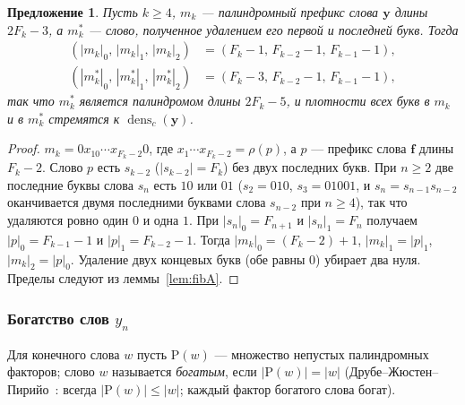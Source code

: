 \documentclass[a4paper,14pt]{extreport}
\theoremstyle{plain}
\newtheorem{proposition}[theorem]{Предложение}
\theoremstyle{definition}
\theoremstyle{remark}
\begin{document}
\begin{proposition}\label{prop:mk}
	Пусть $k\ge4$, $m_k$ --- палиндромный префикс слова $\mathbf y$ длины $2F_k-3$, а $m_k^*$ --- слово, полученное удалением
	его первой и последней букв. Тогда
	\begin{align}
		(|m_k|_0,\,|m_k|_1,\,|m_k|_2)&=(F_k-1,\,F_{k-2}-1,\,F_{k-1}-1),\\
		(|m_k^*|_0,\,|m_k^*|_1,\,|m_k^*|_2)&=(F_k-3,\,F_{k-2}-1,\,F_{k-1}-1),
	\end{align}
	\noindent так что $m_k^*$ является палиндромом длины $2F_k-5$, и плотности всех букв в $m_k$ и в $m_k^*$
	стремятся к $\operatorname{dens}_c(\mathbf y)$.
\end{proposition}
\begin{proof}
	$m_k=0x_10\cdots x_{F_k-2}0$, где $x_1\cdots x_{F_k-2}=\rho(p)$, а $p$ --- префикс слова $\mathbf f$ длины $F_k-2$.
	Слово $p$ есть $s_{k-2}$ ($|s_{k-2}|=F_k$) без двух последних букв. При $n\ge2$ две последние буквы слова $s_n$
	есть $10$ или $01$ ($s_2=010$, $s_3=01001$, и $s_n=s_{n-1}s_{n-2}$ оканчивается двумя последними буквами слова $s_{n-2}$ при $n\ge4$),
	так что удаляются ровно один $0$ и одна $1$. При $|s_n|_0=F_{n+1}$ и $|s_n|_1=F_n$ получаем $|p|_0=F_{k-1}-1$ и
	$|p|_1=F_{k-2}-1$. Тогда $|m_k|_0=(F_k-2)+1$, $|m_k|_1=|p|_1$, $|m_k|_2=|p|_0$. Удаление двух концевых букв
	(обе равны $0$) убирает два нуля. Пределы следуют из леммы~\ref{lem:fibA}.
\end{proof}
\subsubsection{Богатство слов $y_n$}\label{sec:richY}

Для конечного слова $w$ пусть $\mathrm P(w)$ --- множество непустых палиндромных факторов; слово $w$ называется \emph{богатым}, если $|\mathrm P(w)|=|w|$
(Друбе--Жюстен--Пирийо~\cite{Droubay}: всегда $|\mathrm P(w)|\le|w|$; каждый фактор богатого слова богат).
\end{document}
